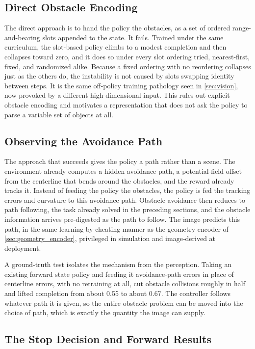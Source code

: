 \subsection{Direct Obstacle Encoding}

The direct approach is to hand the policy the obstacles, as a set of ordered range-and-bearing slots appended to the state. It fails. Trained under the same curriculum, the slot-based policy climbs to a modest completion and then collapses toward zero, and it does so under every slot ordering tried, nearest-first, fixed, and randomized alike. Because a fixed ordering with no reordering collapses just as the others do, the instability is not caused by slots swapping identity between steps. It is the same off-policy training pathology seen in \cref{sec:vision}, now provoked by a different high-dimensional input. This rules out explicit obstacle encoding and motivates a representation that does not ask the policy to parse a variable set of objects at all.

\subsection{Observing the Avoidance Path}

The approach that succeeds gives the policy a path rather than a scene. The environment already computes a hidden avoidance path, a potential-field offset from the centerline that bends around the obstacles, and the reward already tracks it. Instead of feeding the policy the obstacles, the policy is fed the tracking errors and curvature to this avoidance path. Obstacle avoidance then reduces to path following, the task already solved in the preceding sections, and the obstacle information arrives pre-digested as the path to follow. The image predicts this path, in the same learning-by-cheating manner as the geometry encoder of \cref{sec:geometry_encoder}, privileged in simulation and image-derived at deployment.

A ground-truth test isolates the mechanism from the perception. Taking an existing forward state policy and feeding it avoidance-path errors in place of centerline errors, with no retraining at all, cut obstacle collisions roughly in half and lifted completion from about 0.55 to about 0.67. The controller follows whatever path it is given, so the entire obstacle problem can be moved into the choice of path, which is exactly the quantity the image can supply.

\subsection{The Stop Decision and Forward Results}

